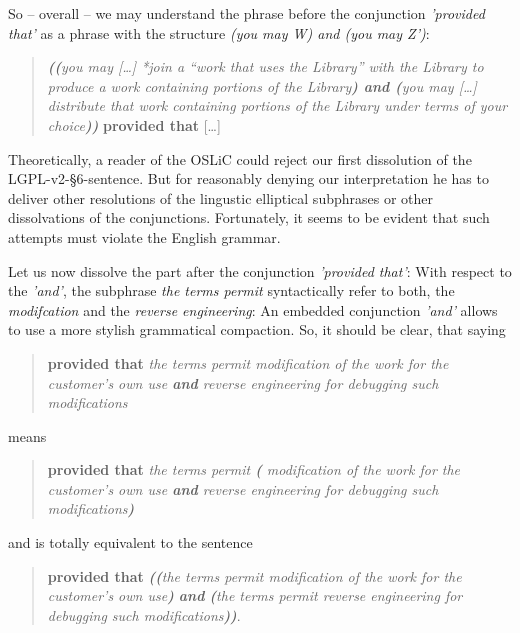 So -- overall -- we may understand the phrase before the conjunction
\emph{'provided that'} as a phrase with the structure \emph{(you may W) and (you
may Z')}:

\begin{quote}\noindent\emph{\textbf{((}you may [\ldots] \emph{*join} a
\enquote{work that uses the Library} with the Library to produce a work
containing portions of the Library\textbf{) and (}you may [\ldots] distribute
that work containing portions of the Library under terms of your
choice\textbf{))}} \textbf{provided that} [\ldots]\end{quote}

Theoretically, a reader of the OSLiC could reject our first dissolution of the
LGPL-v2-§6-sentence. But for reasonably denying our interpretation he has to
deliver other resolutions of the lingustic elliptical subphrases or other
dissolvations of the conjunctions. Fortunately, it seems to be evident that such
attempts must violate the English grammar.

Let us now dissolve the part after the conjunction \emph{'provided that'}:
With respect to the \emph{'and'}, the subphrase \emph{the terms permit}
syntactically refer to both, the \emph{modifcation} and the \emph{reverse
engineering}: An embedded conjunction \emph{'and'} allows to use a more stylish
grammatical compaction. So, it should be clear, that saying

\begin{quote}\noindent\textbf{provided that} \emph{the terms permit modification
of the work for the customer's own use \emph{\textbf{and}} reverse engineering
for debugging such modifications}\end{quote}

means

\begin{quote}\noindent\textbf{provided that} \emph{the terms permit
\textbf{(} modification of the work for the customer's own use \emph{\textbf{and}}
reverse engineering for debugging such modifications\textbf{)}}\end{quote}

and is totally equivalent to the sentence 

\begin{quote}\noindent[\ldots] \textbf{provided that} \emph{\textbf{((}the terms
permit modification of the work for the customer's own use\textbf{)}
\emph{\textbf{and}} \textbf{(}the terms permit reverse engineering for debugging
such modifications\textbf{))}}.
\end{quote}


